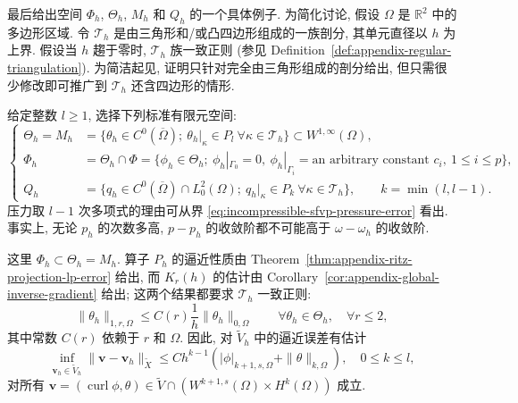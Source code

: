 最后给出空间 $\Phi_h$, $\Theta_h$, $M_h$ 和 $Q_h$ 的一个具体例子.
为简化讨论, 假设 $\Omega$ 是 $\mathbb R^2$ 中的多边形区域.
令 $\mathcal T_h$ 是由三角形和/或凸四边形组成的一族剖分,
其单元直径以 $h$ 为上界.
假设当 $h$ 趨于零时, $\mathcal T_h$ 族一致正则
(参见 Definition~\ref{def:appendix-regular-triangulation}).
为简洁起见, 证明只针对完全由三角形组成的剖分给出,
但只需很少修改即可推广到 $\mathcal T_h$ 还含四边形的情形.

给定整数 $l\geq1$, 选择下列标准有限元空间:
\begin{equation}\label{eq:incompressible-sfvp-standard-fe-spaces}
\left\{
\begin{aligned}
\Theta_h=M_h
&=\{\theta_h\in C^0(\overline\Omega);
\ \theta_h|_\kappa\in P_l
\ \forall\kappa\in\mathcal T_h\}
\subset W^{1,\infty}(\Omega),\\
\Phi_h
&=\Theta_h\cap\Phi
=\{\phi_h\in\Theta_h;
\ \phi_h|_{\Gamma_0}=0,
\ \phi_h|_{\Gamma_i}=\text{an arbitrary constant }c_i,
\ 1\leq i\leq p\},\\
Q_h
&=\{q_h\in C^0(\overline\Omega)\cap L_0^2(\Omega);
\ q_h|_\kappa\in P_k
\ \forall\kappa\in\mathcal T_h\},
\qquad k=\min(l,l-1).
\end{aligned}
\right.
\end{equation}
压力取 $l-1$ 次多项式的理由可从界
\eqref{eq:incompressible-sfvp-pressure-error} 看出.
事实上, 无论 $p_h$ 的次数多高, $p-p_h$ 的收敛阶都不可能高于
$\omega-\omega_h$ 的收敛阶.

这里 $\Phi_h\subset\Theta_h=M_h$.
算子 $P_h$ 的逼近性质由 Theorem~\ref{thm:appendix-ritz-projection-lp-error}
给出, 而 $K_r(h)$ 的估计由 Corollary~\ref{cor:appendix-global-inverse-gradient}
给出; 这两个结果都要求 $\mathcal T_h$ 一致正则:
\begin{equation}\label{eq:incompressible-sfvp-inverse-estimate}
\|\theta_h\|_{1,r,\Omega}
\leq C(r)\frac1h\|\theta_h\|_{0,\Omega}
\qquad\forall\theta_h\in\Theta_h,
\quad\forall r\leq2,
\end{equation}
其中常数 $C(r)$ 依赖于 $r$ 和 $\Omega$.
因此, 对 $\widetilde V_h$ 中的逼近误差有估计
\begin{equation}\label{eq:incompressible-sfvp-kernel-approximation}
\inf_{\mathbf v_h\in\widetilde V_h}
\|\mathbf v-\mathbf v_h\|_{\widetilde X}
\leq Ch^{k-1}
\left(|\phi|_{k+1,s,\Omega}+\|\theta\|_{k,\Omega}\right),
\quad 0\leq k\leq l,
\end{equation}
对所有
$\mathbf v=(\operatorname{curl}\phi,\theta)
\in\widetilde V\cap
(W^{k+1,s}(\Omega)\times H^k(\Omega))$ 成立.


